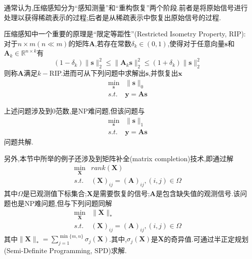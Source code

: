 通常认为,压缩感知分为``感知测量''和``重构恢复''两个阶段.前者是将原始信号进行处理以获得稀疏表示的过程;后者是从稀疏表示中恢复出原始信号的过程.

压缩感知中一个重要的原理是``限定等距性''(Restricted Isometry Property, RIP):对于$n\times m(n\ll m)$的矩阵$\mathbf{A}$,若存在常数$\delta_k\in(0,1)$,使得对于任意向量$\mathbf{s}$和$\mathbf{A}_k\in\mathbb{R}^{n\times k}$有
\begin{equation}
(1-\delta_k)\|\mathbf{s}\|_2^2\le \|\mathbf{A}_k\mathbf{s}\|_2^2\le (1+\delta_k)\|\mathbf{s}\|_2^2
\end{equation}
则称$\mathbf{A}$满足$k-$RIP.进而可从下列问题中求解出$\mathbf{s}$,并恢复出$\mathbf{x}$
\begin{equation}
\begin{split}\min_{\mathbf{s}}&\|\mathbf{s}\|_0\\
s.t.& \mathbf{y=As}\end{split}
\end{equation}

上述问题涉及到$0$范数,是NP难问题,但该问题与
\begin{equation}
\begin{split}\min_{\mathbf{s}}&\|\mathbf{s}\|_1\\
s.t.& \mathbf{y=As}\end{split}
\end{equation}
问题共解.

另外,本节中所举的例子还涉及到矩阵补全(matrix completion)技术,即通过解
\begin{equation}
\begin{split}
\min_{\mathbf{X}}&rank(\mathbf{X})\\
s.t.&(\mathbf{X})_{ij}=(\mathbf{A})_{ij},(i,j)\in\Omega
\end{split}
\end{equation}
其中$\Omega$是已观测值下标集合;$\mathbf{X}$是需要恢复的信号;$\mathbf{A}$是包含缺失值的观测信号.该问题也是NP难问题,但与下列问题同解
\begin{equation}
\begin{split}
\min_{\mathbf{X}}&\|\mathbf{X}\|_{\ast}\\
s.t.&(\mathbf{X})_{ij}=(\mathbf{A})_{ij},(i,j)\in\Omega
\end{split}
\end{equation}
其中$\|\mathbf{X}\|_{\ast}=\sum_{j=1}^{\min\{m,n\}}\sigma_j(\mathbf{X})$.其中,$\sigma_j(\mathbf{X})$是$\mathbf{X}$的奇异值.可通过半正定规划(Semi-Definite Programming, SPD)求解.
